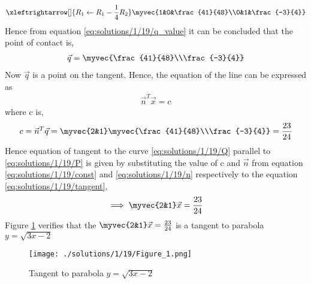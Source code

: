 \begin{align}
\xleftrightarrow[]{R_1\leftarrow R_1-\frac{1}{4}R_2} \myvec{1&0&\frac{41}{48}\\0&1&\frac{-3}{4}}
\label{eq:solutions/1/19/q_value}
\end{align}
Hence from equation \eqref{eq:solutions/1/19/q_value} it can be concluded that the point of contact is,
\begin{align}
\vec{q} = \myvec{\frac{41}{48}\\\frac{-3}{4}}
\end{align}
Now $\vec{q}$ is a point on the tangent. Hence, the equation of the
line can be expressed as
\begin{align}
\vec{n}^T\vec{x} = c
\label{eq:solutions/1/19/tangent}
\end{align}
where c is,
\begin{align}
 c = \vec{n}^T\vec{q} = \myvec{2&1}\myvec{\frac{41}{48}\\\frac{-3}{4}} = \frac{23}{24} 
 \label{eq:solutions/1/19/const}
\end{align}
Hence equation of tangent to the curve \eqref{eq:solutions/1/19/Q} parallel to \eqref{eq:solutions/1/19/P} is given by substituting the value of c and $\vec{n}$ from equation \eqref{eq:solutions/1/19/const} and \eqref{eq:solutions/1/19/n} respectively to the equation \eqref{eq:solutions/1/19/tangent},
\begin{align}
\implies\myvec{2&1}\vec{x} = \frac{23}{24} 
\end{align}
Figure \ref{eq:solutions/1/19/Figure_1} verifies that the $\myvec{2&1}\vec{x} = \frac{23}{24}$ is a tangent to parabola  $y=\sqrt{3x-2}$
\begin{figure}[ht!]
\centering
\texttt{[image: ./solutions/1/19/Figure\_1.png]}
\caption{Tangent to parabola $y=\sqrt{3x-2}$}
\label{eq:solutions/1/19/Figure_1}
\end{figure}

